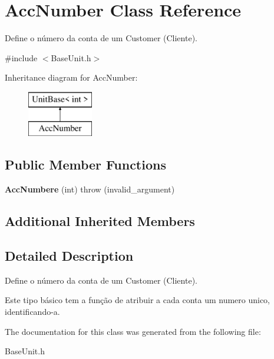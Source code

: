 \hypertarget{classAccNumber}{\section{Acc\-Number Class Reference}
\label{classAccNumber}
}


Define o número da conta de um Customer (Cliente).  




{\ttfamily \#include $<$Base\-Unit.\-h$>$}

Inheritance diagram for Acc\-Number\-:\begin{figure}[H]
\begin{center}
\leavevmode
\includegraphics[height=2.000000cm]{classAccNumber}
\end{center}
\end{figure}
\subsection*{Public Member Functions}
\begin{DoxyCompactItemize}
\item 
\hypertarget{classAccNumber_a135cf83c281ec3ecda84de008207529d}{{\bfseries Acc\-Numbere} (int)  throw (invalid\-\_\-argument)}\label{classAccNumber_a135cf83c281ec3ecda84de008207529d}

\end{DoxyCompactItemize}
\subsection*{Additional Inherited Members}


\subsection{Detailed Description}
Define o número da conta de um Customer (Cliente). 

Este tipo básico tem a função de atribuir a cada conta um numero unico, identificando-\/a. 

The documentation for this class was generated from the following file\-:\begin{DoxyCompactItemize}
\item 
Base\-Unit.\-h\end{DoxyCompactItemize}
